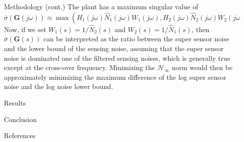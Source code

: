 \documentclass{beamer}
\begin{document}
\begin{frame}[t]
\begin{columns}[t]
\begin{column}{0.32\linewidth}
			
		\end{column}
	
		\begin{column}{0.32\linewidth}
			\begin{block}{Methodology (cont.)}
				The plant has a maximum singular value of
				\begin{equation}
				\bar\sigma(\mathbf{G}(j\omega)) \approx \max{(H_1(j\omega)\hat{N}_1(j\omega)W_1(j\omega),H_2(j\omega)\hat{N}_2(j\omega)W_2(j\omega))}\,,
				\end{equation}
				Now, if we set $W_1(s)=1/\hat{N}_2(s)$ and $W_2(s)=1/\hat{N}_1(s)$, then $\bar\sigma(\mathbf{G}(s))$ can be interpreted as the ratio between the super sensor noise and the lower bound of the sensing noise, assuming that the super sensor noise is dominated one of the filtered sensing noises, which is generally true except at the cross-over frequency.
				Minimizing the $\mathcal{H}_\infty$ norm would then be approximately minimizing the maximum difference of the log super sensor noise and the log noise lower bound.
			\end{block}
			\begin{block}{Results}
			\end{block}
			\begin{block}{Conclusion}
			\end{block}
			\begin{block}{References}
				
				
			\end{block}
		\end{column}
	\end{columns}
\end{frame}
\end{document}
